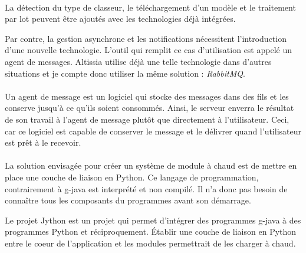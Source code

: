 \paragraph{}
La détection du type de classeur, le téléchargement d'un modèle et le traitement par lot peuvent être ajoutés avec les technologies déjà intégrées.

Par contre, la gestion asynchrone et les notifications nécessitent l'introduction d'une nouvelle technologie.
L'outil qui remplit ce cas d'utilisation est appelé un agent de messages.
Altissia utilise déjà une telle technologie dans d'autres situations et je compte donc utiliser la même solution : \textit{RabbitMQ}.

\paragraph{}
Un agent de message est un logiciel qui stocke des messages dans des fils et les conserve jusqu'à ce qu'ils soient consommés.
Ainsi, le serveur enverra le résultat de son travail à l'agent de message plutôt que directement à l'utilisateur.
Ceci, car ce logiciel est capable de conserver le message et le délivrer quand l'utilisateur est prêt à le recevoir.

\paragraph{}
La solution envisagée pour créer un système de module à chaud est de mettre en place une couche de liaison en Python.
Ce langage de programmation, contrairement à \Gls{g-java} est interprété et non compilé.
Il n'a donc pas besoin de connaître tous les composants du programmes avant son démarrage.

Le projet Jython est un projet qui permet d'intégrer des programmes \Gls{g-java} à des programmes Python et réciproquement.
Établir une couche de liaison en Python entre le coeur de l'application et les modules permettrait de les charger à chaud\cite{lutz_learning_2003}.
